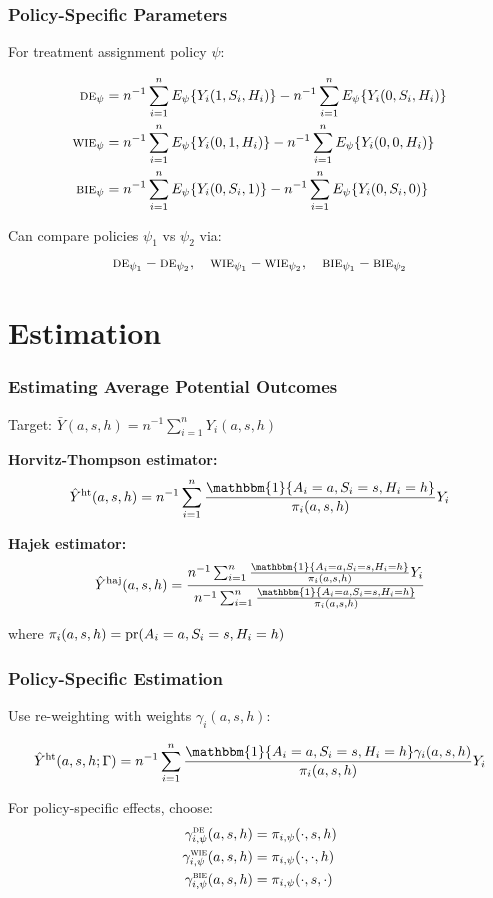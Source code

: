 \documentclass{beamer}
\newcommand{\indicator}{\mathbbm{1}}
\newcommand{\de}{\textsc{de}}
\newcommand{\bie}{\textsc{bie}}
\newcommand{\wie}{\textsc{wie}}
\newcommand{\horthom}{\textup{ht}}
\newcommand{\haj}{\textup{haj}}
\newcommand{\pscore}[1]{\pi_{#1}}
\newcommand{\pr}{\textup{pr}}
\newcommand{\sumi}{\sum_{i=1}^n}
\begin{document}
\begin{frame}
\frametitle{Policy-Specific Parameters}
For treatment assignment policy $\psi$:

\begin{align}
\de_\psi &= n^{-1}\sumi E_\psi\{Y_i(1,S_i,H_i)\} - n^{-1}\sumi E_\psi\{Y_i(0,S_i,H_i)\} \\
\wie_\psi &= n^{-1}\sumi E_\psi\{Y_i(0,1,H_i)\} - n^{-1}\sumi E_\psi\{Y_i(0,0,H_i)\} \\
\bie_\psi &= n^{-1}\sumi E_\psi\{Y_i(0,S_i,1)\} - n^{-1}\sumi E_\psi\{Y_i(0,S_i,0)\}
\end{align}

\vspace{0.5cm}
Can compare policies $\psi_1$ vs $\psi_2$ via:
$$\de_{\psi_1} - \de_{\psi_2}, \quad \wie_{\psi_1} - \wie_{\psi_2}, \quad \bie_{\psi_1} - \bie_{\psi_2}$$
\end{frame}

\section{Estimation}

\begin{frame}
\frametitle{Estimating Average Potential Outcomes}
Target: $\bar{Y}(a,s,h) = n^{-1}\sumi Y_i(a,s,h)$

\vspace{0.5cm}
\textbf{Horvitz-Thompson estimator:}
$$\hat{Y}^{\horthom}(a,s,h) = n^{-1}\sumi\frac{\indicator\{A_i=a, S_i=s, H_i=h\}}{\pscore{i}(a,s,h)}Y_i$$

\vspace{0.5cm}
\textbf{Hajek estimator:}
$$\hat{Y}^{\haj}(a,s,h) = \frac{n^{-1}\sumi\frac{\indicator\{A_i=a, S_i=s, H_i=h\}}{\pscore{i}(a,s,h)}Y_i}{n^{-1}\sumi\frac{\indicator\{A_i=a, S_i=s, H_i=h\}}{\pscore{i}(a,s,h)}}$$

where $\pscore{i}(a,s,h) = \pr(A_i=a, S_i=s, H_i=h)$
\end{frame}

\begin{frame}
\frametitle{Policy-Specific Estimation}
Use re-weighting with weights $\gamma_i(a,s,h)$:

$$\hat{Y}^{\horthom}(a,s,h;\Gamma) = n^{-1}\sumi\frac{\indicator\{A_i=a, S_i=s, H_i=h\}\gamma_i(a,s,h)}{\pscore{i}(a,s,h)}Y_i$$

\vspace{0.5cm}
For policy-specific effects, choose:
\begin{align}
\gamma_{i,\psi}^{\de}(a,s,h) &= \pscore{i,\psi}(\cdot,s,h) \\
\gamma_{i,\psi}^{\wie}(a,s,h) &= \pscore{i,\psi}(\cdot,\cdot,h) \\
\gamma_{i,\psi}^{\bie}(a,s,h) &= \pscore{i,\psi}(\cdot,s,\cdot)
\end{align}
\end{frame}
\end{document}
